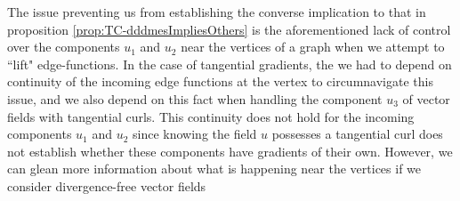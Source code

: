 The issue preventing us from establishing the converse implication to that in proposition \ref{prop:TC-dddmesImpliesOthers} is the aforementioned lack of control over the components $u_1$ and $u_2$ near the vertices of a graph when we attempt to ``lift" edge-functions.
In the case of tangential gradients, the we had to depend on continuity of the incoming edge functions at the vertex to circumnavigate this issue, and we also depend on this fact when handling the component $u_3$ of vector fields with tangential curls.
This continuity does not hold for the incoming components $u_1$ and $u_2$ since knowing the field $u$ possesses a tangential curl does not establish whether these components have gradients of their own.
However, we can glean more information about what is happening near the vertices if we consider divergence-free vector fields